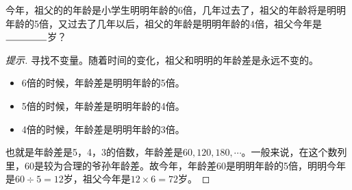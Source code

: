 \begin{question}
  今年，祖父的的年龄是小学生明明年龄的6倍，几年过去了，祖父的年龄将是明明年龄的5倍，又过去了几年以后，祖父的年龄是明明年龄的4倍，祖父今年是$\blankline$岁？
\end{question}
\begin{proof}[提示]
  寻找不变量。随着时间的变化，祖父和明明的年龄差是永远不变的。
  \begin{itemize}
  \item 6倍的时候，年龄差是明明年龄的5倍。
  \item 5倍的时候，年龄差是明明年龄的4倍。
  \item 4倍的时候，年龄差是明明年龄的3倍。
  \end{itemize}
  也就是年龄差是5，4，3的倍数，年龄差是$60,120,180,\cdots$。一般来说，在这个数列里，60是较为合理的爷孙年龄差。故今年，年龄差60是明明年龄的5倍，明明今年是$60\div5=12$岁，祖父今年是$12\times6=72$岁。
\end{proof}


